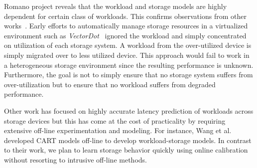 Romano\cite{} project reveals that the workload and storage models are highly dependent for certain class of workloads. 
This confirms observations from other works~\cite{relative-fitness, benchmark}.  
Early efforts to automatically manage storage resources in a virtualized environment such as \emph{VectorDot}~\cite{vectordot} ignored the workload and simply concentrated on utilization of each storage system. 
A workload from the over-utilized device is simply migrated over to less utilized device. 
This approach would fail to work in a heterogeneous storage environment since the resulting performance is unknown.
Furthermore, the goal is not to simply ensure that no storage system suffers from over-utilization but to ensure that no workload suffers from degraded performance. 

Other work has focused on highly accurate latency prediction of workloads across storage devices but this has come at the cost of practicality by requiring extensive off-line experimentation and modeling. 
For instance, Wang et al.~\cite{relative-fitness} developed CART models off-line to develop workload-storage models. 
In contrast to their work, we plan to learn storage behavior quickly using online calibration without resorting to intrusive off-line methods.

